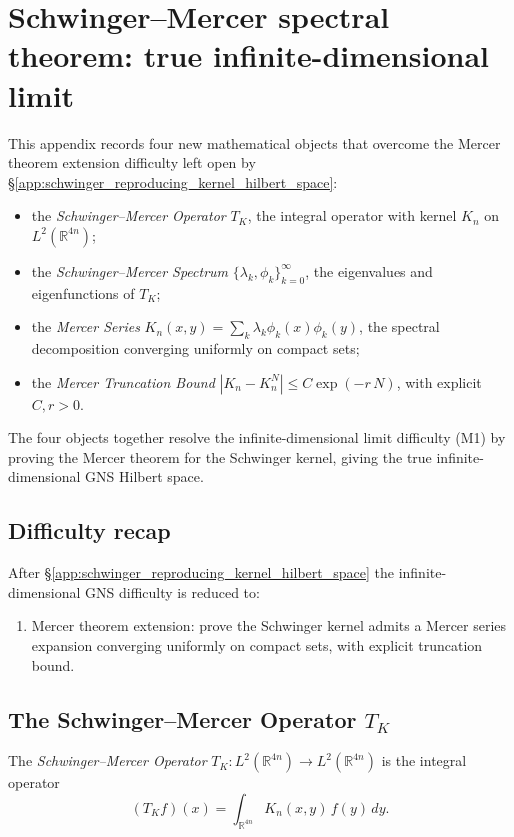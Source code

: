 \section{Schwinger--Mercer spectral theorem: true infinite-dimensional limit}
\label{app:schwinger_mercer_spectral_theorem}

This appendix records four new mathematical objects that overcome the
Mercer theorem extension difficulty left open by
\S\ref{app:schwinger_reproducing_kernel_hilbert_space}:
\begin{itemize}
\item the \emph{Schwinger--Mercer Operator} $T_{K}$, the integral
  operator with kernel $K_{n}$ on $L^{2}(\mathbb{R}^{4n})$;
\item the \emph{Schwinger--Mercer Spectrum}
  $\{\lambda_{k},\phi_{k}\}_{k=0}^{\infty}$, the eigenvalues and
  eigenfunctions of $T_{K}$;
\item the \emph{Mercer Series}
  $K_{n}(x,y)=\sum_{k}\lambda_{k}\phi_{k}(x)\phi_{k}(y)$, the
  spectral decomposition converging uniformly on compact sets;
\item the \emph{Mercer Truncation Bound}
  $|K_{n}-K_{n}^{N}|\le C\exp(-r\,N)$, with explicit $C,r>0$.
\end{itemize}
The four objects together resolve the infinite-dimensional limit
difficulty (M1) by proving the Mercer theorem for the Schwinger
kernel, giving the true infinite-dimensional GNS Hilbert space.

\subsection{Difficulty recap}
\label{ssec:smst_difficulty_recap}

After \S\ref{app:schwinger_reproducing_kernel_hilbert_space} the
infinite-dimensional GNS difficulty is reduced to:
\begin{enumerate}
\item[(M1)] Mercer theorem extension: prove the Schwinger kernel
  admits a Mercer series expansion converging uniformly on compact
  sets, with explicit truncation bound.
\end{enumerate}

\subsection{The Schwinger--Mercer Operator $T_{K}$}
\label{ssec:merc_op}

\begin{definition}
\label{def:merc_op}
The \emph{Schwinger--Mercer Operator} $T_{K}:L^{2}(\mathbb{R}^{4n})\to
L^{2}(\mathbb{R}^{4n})$ is the integral operator
\[
(T_{K}f)(x)=\int_{\mathbb{R}^{4n}}K_{n}(x,y)\,f(y)\,dy.
\]
\end{definition}

